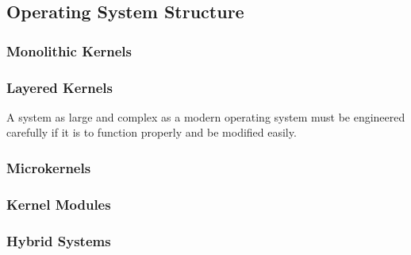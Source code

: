 \subsection{Operating System Structure}\label{subsec:OS_Structure}
\subsubsection{Monolithic Kernels}\label{subsubsec:Monolithic_Kernels}
\subsubsection{Layered Kernels}\label{subsubsec:Layered_Kernels}
A system as large and complex as a modern operating system must be engineered carefully if it is to function properly and be modified easily.

\subsubsection{Microkernels}\label{subsubsec:Microkernels}
\subsubsection{Kernel Modules}\label{subsubsec:Kernel_Modules}
\subsubsection{Hybrid Systems}\label{subsubsec:Hybrid_Systems}

